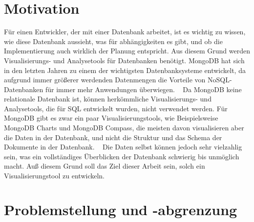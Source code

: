 \iffalse
Die Einleitung dient dazu, beim Leser Interesse für die Inhalte 
Praxissemesterberichts zu wecken, die behandelten Probleme aufzuzeigen 
und die zu ihrer Lösung entwickelten Konzepte zu beschreiben.
\fi

\section{Motivation}
\label{sec:motivation}

\iffalse
In der Motivation wird dargestellt, welche Bedeutung die im 
Praxissemester zu entwickelnden Lösungen für das betreuende Unternehmen 
haben. Es wird beispielsweise aufzeigt, in welches Produkt sie eingehen, 
welcher Ablauf verbessert werden soll etc.
\fi

Für einen Entwickler, der mit einer Datenbank arbeitet, ist es wichtig zu wissen, wie diese Datenbank aussieht, was für abhängigkeiten es gibt, und ob die Implementierung auch wirklich der Planung entspricht.
Aus diesem Grund werden Visualisierungs- und Analysetools für Datenbanken benötigt.
MongoDB hat sich in den letzten Jahren zu einem der wichtigsten Datenbanksysteme entwickelt, da aufgrund immer größerer werdenden Datenmengen die Vorteile von NoSQL-Datenbanken für immer mehr Anwendungen überwiegen.
~\autocite{db-engines:mongodb}
Da MongoDB keine relationale Datenbank ist, können herkömmliche Visualisierungs- und Analysetools, die für SQL entwickelt wurden, nicht verwendet werden.
Für MongoDB gibt es zwar ein paar Visualisierungstools, wie Beispielsweise MongoDB Charts und MongoDB Compass, die meisten davon visualisieren aber die Daten in der Datenbank, und nicht die Struktur und das Schema der Dokumente in der Datenbank.
~\autocite{knowi:mongo_vis_tools}
Die Daten selbst können jedoch sehr vielzahlig sein, was ein vollständiges Überblicken der Datenbank schwierig bis unmöglich macht.
Auß diesem Grund soll das Ziel dieser Arbeit sein, solch ein Visualisierungstool zu entwickeln.

\section{Problemstellung und -abgrenzung}
\label{sec:problemstellung}

\iffalse
Die Problemstellung dient dazu, das zu lösende Problem klar zu 
definieren und abzugrenzen. Der Praktikant soll ein klares Verständnis 
des zu lösenden Problems haben. Insbesondere soll auch verhindert 
werden, dass zu viele Probleme gleichzeitig angegangen werden. Eine 
Negativabgrenzung verhindert, dass beim Leser später nicht erfüllte 
Erwartungen geweckt werden.
\fi

